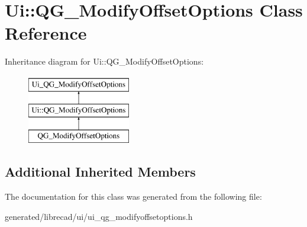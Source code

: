 \hypertarget{classUi_1_1QG__ModifyOffsetOptions}{\section{Ui\-:\-:Q\-G\-\_\-\-Modify\-Offset\-Options Class Reference}
\label{classUi_1_1QG__ModifyOffsetOptions}
}
Inheritance diagram for Ui\-:\-:Q\-G\-\_\-\-Modify\-Offset\-Options\-:\begin{figure}[H]
\begin{center}
\leavevmode
\includegraphics[height=3.000000cm]{classUi_1_1QG__ModifyOffsetOptions}
\end{center}
\end{figure}
\subsection*{Additional Inherited Members}


The documentation for this class was generated from the following file\-:\begin{DoxyCompactItemize}
\item 
generated/librecad/ui/ui\-\_\-qg\-\_\-modifyoffsetoptions.\-h\end{DoxyCompactItemize}
